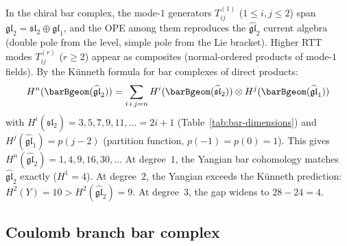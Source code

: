 \begin{remark}
\label{rem:yangian-gl2-kunneth}
In the chiral bar complex, the mode-$1$ generators
$T_{ij}^{(1)}$ ($1 \leq i,j \leq 2$) span
$\mathfrak{gl}_2 = \mathfrak{sl}_2 \oplus \mathfrak{gl}_1$, and
the OPE among them reproduces the $\widehat{\mathfrak{gl}}_2$
current algebra (double pole from the level, simple pole from
the Lie bracket). Higher RTT modes $T_{ij}^{(r)}$
($r \geq 2$) appear as composites
(normal-ordered products of mode-$1$ fields).
By the K\"unneth formula for bar complexes
of direct products:
\[
H^n(\barBgeom(\widehat{\mathfrak{gl}}_2))
= \sum_{i+j = n}
H^i(\barBgeom(\widehat{\mathfrak{sl}}_2))
\otimes
H^j(\barBgeom(\widehat{\mathfrak{gl}}_1))
\]
with $H^i(\widehat{\mathfrak{sl}}_2) = 3, 5, 7, 9, 11, \ldots = 2i{+}1$
(Table~\ref{tab:bar-dimensions}) and
$H^j(\widehat{\mathfrak{gl}}_1) = p(j{-}2)$ (partition function,
$p({-}1) = p(0) = 1$). This gives
$H^n(\widehat{\mathfrak{gl}}_2) = 1, 4, 9, 16, 30, \ldots$
At degree~$1$, the Yangian bar cohomology matches
$\widehat{\mathfrak{gl}}_2$ exactly ($H^1 = 4$).
At degree~$2$, the Yangian exceeds the K\"unneth prediction:
$H^2(Y) = 10 > H^2(\widehat{\mathfrak{gl}}_2) = 9$.
At degree~$3$, the gap widens to $28 - 24 = 4$.
\end{remark}


\subsection{Coulomb branch bar complex}

